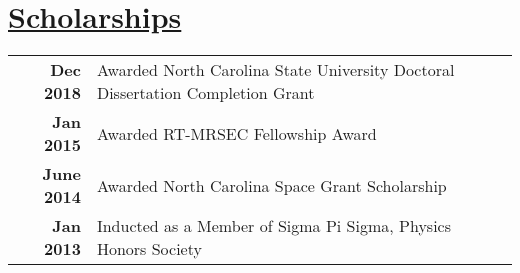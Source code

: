 \documentclass[]{deedy-resume-openfont}
\begin{document}
\begin{minipage}[t]{.90\textwidth}

\section{\underline{Scholarships}}
\runsubsection{}
\begin{flushleft}
\begin{tabular}{rll}
\textbf{Dec 2018}    &   Awarded North Carolina State University Doctoral Dissertation Completion Grant \\
\textbf{Jan 2015}	&	Awarded RT-MRSEC Fellowship Award \\
\textbf{June 2014}	&	Awarded North Carolina Space Grant Scholarship \\
\textbf{Jan 2013}	&	Inducted as a Member of Sigma Pi Sigma, Physics Honors Society \\
\end{tabular}
\end{flushleft}
\end{minipage}
\end{document}
